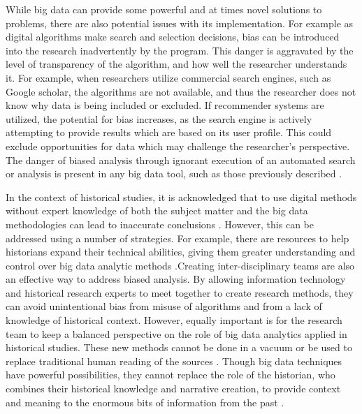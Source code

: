 \documentclass[sigconf]{acmart}
\begin{document}
While big data can provide some powerful and at times novel solutions to problems, there are also potential issues with its implementation. For example as digital algorithms make search and selection decisions, bias can be introduced into the research inadvertently by the program. This danger is aggravated by the level of transparency of the algorithm, and how well the researcher understands it. For example, when researchers utilize commercial search engines, such as Google scholar, the algorithms are not available, and thus the researcher does not know why data is being included or excluded. If recommender systems are utilized, the potential for bias increases, as the search engine is actively attempting to provide results which are based on its user profile. This could exclude opportunities for data which may challenge the researcher's perspective. The danger of biased analysis through ignorant execution of an automated search or analysis is present in any big data tool, such as those previously described \cite{bigdatacritique}.

In the context of historical studies, it is acknowledged that to use digital methods without expert knowledge of both the subject matter and the big data methodologies can lead to inaccurate conclusions \cite{digitalrepublicletters}. However, this can be addressed using a number of strategies. For example, there are resources to help historians expand their technical abilities, giving them greater understanding and control over big data analytic methods \cite{proghistabout}.Creating inter-disciplinary teams are also an effective way to address biased analysis. By allowing information technology and historical research experts to meet together to create research methods, they can avoid unintentional bias from misuse of algorithms and from a lack of knowledge of historical context. However, equally important is for the  research team to keep a balanced perspective on the role of  big data analytics applied in historical studies. These new methods cannot be done in a vacuum or be used to replace traditional human reading of the sources \cite{digitalrepublicletters}. Though big data techniques have powerful possibilities, they cannot replace the role of the historian, who combines their historical knowledge and narrative creation, to provide context and meaning to the enormous bits of information from the past \cite{bdglobalhist}.
\end{document}

